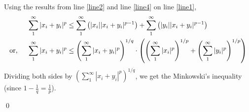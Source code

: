 \begin{solution}
    Using the results from line \ref{line2} and line \ref{line4} on line
    \ref{line1},
    \begin{align}
      \sum_{1}^{\infty}{|x_{i} + y_{i}|^p}
      &\leq \sum_{1}^{\infty}{\left(|x_i||x_{i} + y_{i}|^{p-1}\right)}
      +\sum_{1}^{\infty}{\left(|y_i||x_{i} + y_{i}|^{p-1}\right)}\\
      \text{or,}\hspace*{5mm}
      \sum_{1}^{\infty}{|x_{i} + y_{i}|^p}
      &\leq\left(\sum_{1}^{\infty}{|x_i+y_i|^{p}}\right)^{1/q}
      \cdot\left(\left(\sum_{1}^{\infty}{|x_i|^p}\right)^{1/p}
      +\left(\sum_{1}^{\infty}{|y_i|^p}\right)^{1/p}\right)
    \end{align}
    Dividing both sides by
    $\left(\sum_{1}^{\infty}{|x_i+y_i|^{p}}\right)^{1/q}$,
    we get the Minkowski's inequality (since $1-\frac{1}{q}=\frac{1}{p}$).
    
    \qed
\end{solution}